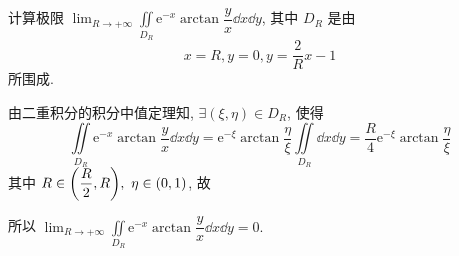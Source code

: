 \begin{example}
    计算极限 $\displaystyle\lim_{R\to+\infty}\iint\limits_{D_R}\mathrm{e}^{-x}\arctan\dfrac{y}{x}\dd x\dd y$, 其中 $D_R$ 是由 $$x=R,y=0,y=\dfrac{2}{R}x-1$$ 所围成.
\end{example}
\begin{solution}
    由二重积分的积分中值定理知, $\exists(\xi,\eta)\in D_R$,
    使得 $$\iint\limits_{D_R}\mathrm{e}^{-x}\arctan\dfrac{y}{x}\dd x\dd y=\mathrm{e}^{-\xi}\arctan\dfrac{\eta}{\xi}\iint\limits_{D_R}\dd x\dd y=\dfrac{R}{4}\mathrm{e}^{-\xi}\arctan\dfrac{\eta}{\xi}$$
    其中 $R\in\qty(\dfrac{R}{2},R),~\eta\in(0,1)$, 故 
    所以 $\displaystyle\lim_{R\to+\infty}\iint\limits_{D_R}\mathrm{e}^{-x}\arctan\dfrac{y}{x}\dd x\dd y=0.$
\end{solution}

